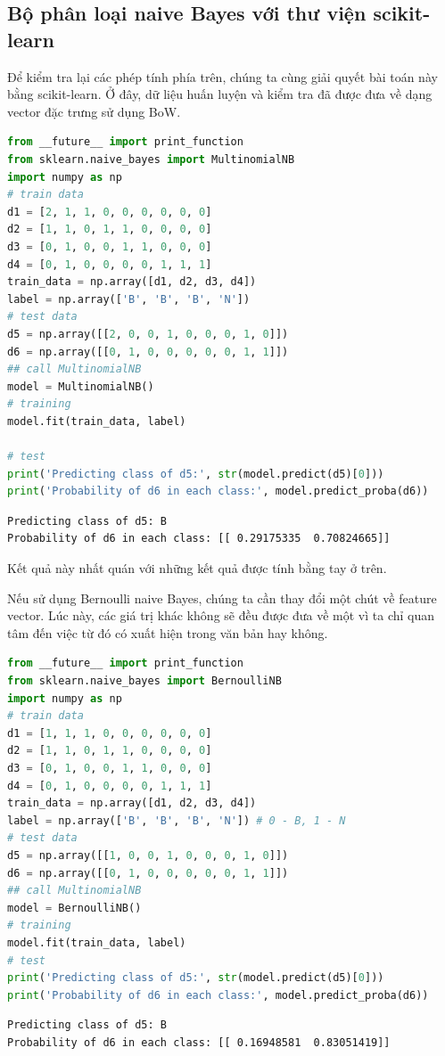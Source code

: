 \subsection{Bộ phân loại naive Bayes với thư viện scikit-learn}

Để kiểm tra lại các phép tính phía trên, chúng ta cùng giải quyết bài toán này bằng scikit-learn. Ở đây, dữ liệu huấn luyện và kiểm tra đã được đưa về dạng vector đặc trưng sử dụng BoW.
\newpage
\begin{lstlisting}[language=Python]
from __future__ import print_function
from sklearn.naive_bayes import MultinomialNB
import numpy as np
# train data
d1 = [2, 1, 1, 0, 0, 0, 0, 0, 0]
d2 = [1, 1, 0, 1, 1, 0, 0, 0, 0]
d3 = [0, 1, 0, 0, 1, 1, 0, 0, 0]
d4 = [0, 1, 0, 0, 0, 0, 1, 1, 1]
train_data = np.array([d1, d2, d3, d4])
label = np.array(['B', 'B', 'B', 'N'])
# test data
d5 = np.array([[2, 0, 0, 1, 0, 0, 0, 1, 0]])
d6 = np.array([[0, 1, 0, 0, 0, 0, 0, 1, 1]])
## call MultinomialNB
model = MultinomialNB()
# training
model.fit(train_data, label)

# test
print('Predicting class of d5:', str(model.predict(d5)[0]))
print('Probability of d6 in each class:', model.predict_proba(d6))
\end{lstlisting}
\kq
\begin{lstlisting}
Predicting class of d5: B
Probability of d6 in each class: [[ 0.29175335  0.70824665]]
\end{lstlisting}
Kết quả này nhất quán với những kết quả được tính bằng tay ở trên.

Nếu sử dụng Bernoulli naive Bayes, chúng ta cần thay đổi một chút về
feature vector. Lúc này, các giá trị khác không sẽ đều được đưa về một vì ta chỉ
quan tâm đến việc từ đó có xuất hiện trong văn bản hay không.
\begin{lstlisting}[language=Python]
from __future__ import print_function
from sklearn.naive_bayes import BernoulliNB
import numpy as np
# train data
d1 = [1, 1, 1, 0, 0, 0, 0, 0, 0]
d2 = [1, 1, 0, 1, 1, 0, 0, 0, 0]
d3 = [0, 1, 0, 0, 1, 1, 0, 0, 0]
d4 = [0, 1, 0, 0, 0, 0, 1, 1, 1]
train_data = np.array([d1, d2, d3, d4])
label = np.array(['B', 'B', 'B', 'N']) # 0 - B, 1 - N
# test data
d5 = np.array([[1, 0, 0, 1, 0, 0, 0, 1, 0]])
d6 = np.array([[0, 1, 0, 0, 0, 0, 0, 1, 1]])
## call MultinomialNB
model = BernoulliNB()
# training
model.fit(train_data, label)
# test
print('Predicting class of d5:', str(model.predict(d5)[0]))
print('Probability of d6 in each class:', model.predict_proba(d6))
\end{lstlisting}
\kq
\begin{lstlisting}
Predicting class of d5: B
Probability of d6 in each class: [[ 0.16948581  0.83051419]]
\end{lstlisting}

